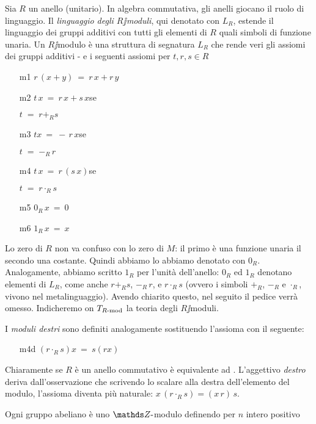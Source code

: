 Sia $R$ un anello (unitario). In algebra commutativa, gli anelli giocano il ruolo di linguaggio. Il \emph{linguaggio degli $R\jj$moduli}, qui denotato con \emph{$L_R$}, estende il linguaggio dei gruppi additivi con tutti gli elementi di $R$ quali simboli di funzione unaria. Un $R\jj$modulo \`e una struttura di segnatura $L_R$ che rende veri gli assiomi dei gruppi additivi - e i seguenti assiomi per $t,r,s\in R$

\begin{itemize}
\item[m1] $r\,(x+y)\ =\ r\,x+r\,y$
\item[m2] $t\,x\ =\ r\,x+s\,x$\hfill se \ \parbox{50ex}{$t\;=\;r+_Rs$}
\item[m3] $t x\ =\ -\,r\,x$\hfill se \    \parbox{50ex}{$t\;=\;-_R\,r$}
\item[m4] $t\,x\ =\ r\,(s\,x)$\hfill se \ \parbox{50ex}{$t\;=\;r\cdot_Rs$}
\item[m5] $0_R\,x\ =\ 0$
\item[m6] $1_R\,x\ =\ x$
\end{itemize}

Lo zero di $R$ non va confuso con lo zero di $M$: il primo \`e una funzione unaria il secondo una costante. Quindi abbiamo lo abbiamo denotato con $0_R$. Analogamente, abbiamo scritto $1_R$ per l'unit\`a dell'anello: $0_R$ ed $1_R$ denotano elementi di $L_R$, come anche $r+_Rs$, $-_R\,r$, e $r\cdot_Rs$ (ovvero i simboli $+_R$, $-_R$ e $\cdot_R$, vivono nel metalinguaggio). Avendo chiarito questo, nel seguito il pedice verr\`a omesso. Indicheremo on \emph{$T_{\mbox{\scriptsize $R$-mod}}$\/} la teoria degli $R\jj$moduli.

I \emph{moduli destri\/} sono definiti analogamente sostituendo l'assioma  con il seguente:

\begin{itemize}
\item[m4d] $(r\cdot_Rs)x\ =\ s(rx)$
\end{itemize}

Chiaramente se $R$ \`e un anello commutativo  \`e equivalente ad . L'aggettivo \textit{destro\/} deriva dall'osservazione che scrivendo lo scalare alla destra dell'elemento del modulo, l'assioma  diventa pi\`u naturale: $x\,(r\cdot_Rs)=(x\,r)\,s$.

Ogni gruppo abeliano \`e uno $\ZZ\jj$modulo definendo per $n$ intero positivo


